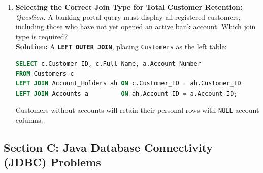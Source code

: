 \begin{enumerate}[resume*]
\item \textbf{Selecting the Correct Join Type for Total Customer Retention:}
\textit{Question:} A banking portal query must display all registered customers, including those who have not yet opened an active bank account. Which join type is required? \\
\textbf{Solution:} A \textbf{\texttt{LEFT OUTER JOIN}}, placing \texttt{Customers} as the left table:
\begin{lstlisting}[language=SQL]
SELECT c.Customer_ID, c.Full_Name, a.Account_Number
FROM Customers c
LEFT JOIN Account_Holders ah ON c.Customer_ID = ah.Customer_ID
LEFT JOIN Accounts a         ON ah.Account_ID = a.Account_ID;
\end{lstlisting}
Customers without accounts will retain their personal rows with \texttt{NULL} account columns.
\end{enumerate}

\subsection{Section C: Java Database Connectivity (JDBC) Problems}

